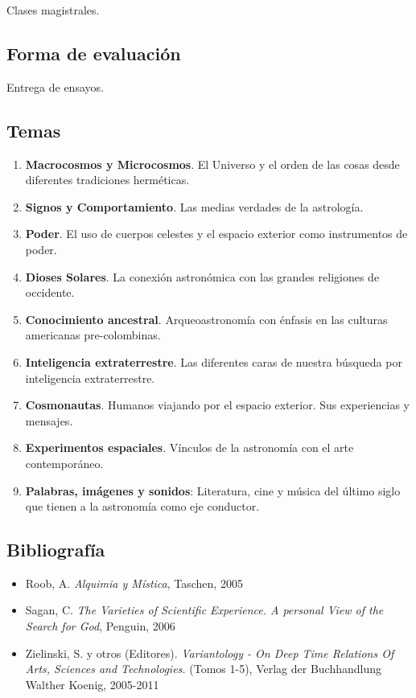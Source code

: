 \documentclass{report}
\begin{document}
Clases magistrales.

\subsection*{Forma de evaluaci\'on}

Entrega de ensayos.

\subsection*{Temas}

\begin{enumerate}
\item {\bf Macrocosmos y Microcosmos}. El Universo y el orden de las
  cosas desde diferentes tradiciones herm\'eticas.
\item {\bf Signos y Comportamiento}. Las medias verdades de la astrolog\'ia.
\item {\bf Poder}. El uso de cuerpos celestes y el espacio exterior como instrumentos de poder. 
\item {\bf Dioses Solares}. La conexi\'on astron\'omica con las grandes religiones de occidente. 
\item {\bf Conocimiento ancestral}. Arqueoastronom\'ia con \'enfasis en las culturas americanas pre-colombinas.
\item {\bf Inteligencia extraterrestre}. Las diferentes caras de
  nuestra b\'usqueda por inteligencia extraterrestre.
\item {\bf Cosmonautas}. Humanos viajando por el espacio exterior. Sus experiencias y mensajes.
\item {\bf Experimentos espaciales}. V\'inculos de la astronom\'ia con
  el arte contempor\'aneo.
\item {\bf Palabras, im\'agenes y sonidos}: Literatura, cine y
  m\'usica del \'ultimo siglo que tienen a la astronom\'ia como eje conductor.
\end{enumerate}

\subsection*{Bibliografía}

\begin{itemize}
\item Roob, A. \emph{Alquimia y M\'istica}, Taschen, 2005
\item Sagan, C. \emph{The Varieties of Scientific Experience. A personal View of the Search for God}, Penguin, 2006
\item Zielinski, S. y otros (Editores). \emph{Variantology - On Deep Time
  Relations Of Arts, Sciences and Technologies.} (Tomos 1-5), Verlag
der Buchhandlung Walther Koenig, 2005-2011
\end{itemize}
\end{document}
